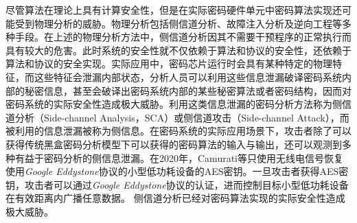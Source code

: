 {	尽管算法在理论上具有计算安全性，但是在实际密码硬件单元中密码算法实现还可能受到物理分析的威胁。物理分析包括侧信道分析、故障注入分析\citep{Biham97}及逆向工程\citep{Perrin17}等多种手段。在上述的物理分析方法中，侧信道分析因其不需要干预程序的正常执行而具有较大的危害。此时系统的安全性就不仅依赖于算法和协议的安全性，还依赖于算法和协议的安全实现。实际应用中，密码芯片运行时会具有某种特定的物理特征，而这些特征会泄漏内部状态，分析人员可以利用这些信息泄漏破译密码系统内部的秘密信息，甚至会破译出密码系统内部的某些秘密算法或者密码结构，因而对密码系统的实际安全性造成极大威胁。利用这类信息泄漏的密码分析方法称为侧信道分析（Side-channel Analysis，SCA）或侧信道攻击（Side-channel Attack），而被利用的信息泄漏被称为侧信息。在密码系统的实际应用场景下，攻击者除了可以获得传统黑盒密码分析模型下可以获得的密码算法的输入与输出，还可以观测到多种有益于密码分析的侧信息泄漏。在2020年，Camurati等\citep{Camurati20}只使用无线电信号恢复使用\textit{Google Eddystone}\citep{Eddystone}协议的小型低功耗设备的AES密钥。一旦攻击者获得AES密钥，攻击者可以通过\textit{Google Eddystone}协议的认证，进而控制目标小型低功耗设备在有效距离内广播任意数据。
	侧信道分析已经对密码算法实现的实际安全性造成极大威胁。
	
}
